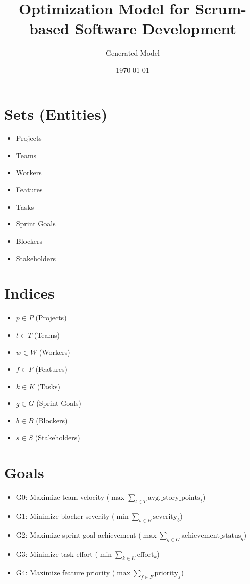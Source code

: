 \documentclass{article}
\title{Optimization Model for Scrum-based Software Development}
\author{Generated Model}
\date{\today}
\begin{document}
\maketitle
\tableofcontents

\section{Sets (Entities)}
\begin{itemize}
    \item Projects
    \item Teams
    \item Workers
    \item Features
    \item Tasks
    \item Sprint Goals
    \item Blockers
    \item Stakeholders
\end{itemize}

\section{Indices}
\begin{itemize}
    \item $p \in P$ (Projects)
    \item $t \in T$ (Teams)
    \item $w \in W$ (Workers)
    \item $f \in F$ (Features)
    \item $k \in K$ (Tasks)
    \item $g \in G$ (Sprint Goals)
    \item $b \in B$ (Blockers)
    \item $s \in S$ (Stakeholders)
\end{itemize}

\section{Goals}
\begin{itemize}
    \item G0: Maximize team velocity ($\max \sum_{t \in T} \text{avg.\_story\_points}_t$)
    \item G1: Minimize blocker severity ($\min \sum_{b \in B} \text{severity}_b$)
    \item G2: Maximize sprint goal achievement ($\max \sum_{g \in G} \text{achievement\_status}_g$)
    \item G3: Minimize task effort ($\min \sum_{k \in K} \text{effort}_k$)
    \item G4: Maximize feature priority ($\max \sum_{f \in F} \text{priority}_f$)
\end{itemize}
\end{document}
